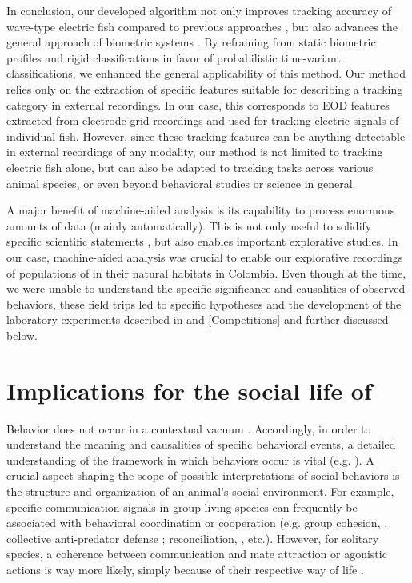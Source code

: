 In conclusion, our developed algorithm not only improves tracking accuracy of wave-type electric fish compared to previous approaches \citep{Madhav2018, Henninger2020}, but also advances the general approach of biometric systems \citep{Kuhl2013}. By refraining from static biometric profiles and rigid classifications in favor of probabilistic time-variant classifications, we enhanced the general applicability of this method. Our method relies only on the extraction of specific features suitable for describing a tracking category in external recordings. In our case, this corresponds to EOD features extracted from electrode grid recordings and used for tracking electric signals of individual fish. However, since these tracking features can be anything detectable in external recordings of any modality, our method is not limited to tracking electric fish alone, but can also be adapted to tracking tasks across various animal species, or even beyond behavioral studies or science in general. 

A major benefit of machine-aided analysis is its capability to process enormous amounts of data (mainly automatically). This is not only useful to solidify specific scientific statements \citep{Gomez2014, Dell2014}, but also enables important explorative studies. In our case, machine-aided analysis was crucial to enable our explorative recordings of populations of \lepto{} in their natural habitats in Colombia. Even though at the time, we were unable to understand the specific significance and causalities of observed behaviors, these field trips led to specific hypotheses and the development of the laboratory experiments described in  and \ref{Competitions} and further discussed below. 

\section{Implications for the social life of \lepto{}}

Behavior does not occur in a contextual vacuum \citep{Rendall1999, Seyfarth2017, Henninger2018}. Accordingly, in order to understand the meaning and causalities of specific behavioral events, a detailed understanding of the framework in which behaviors occur is vital (e.g. \citealp{Rendall1999, Henninger2018}). A crucial aspect shaping the scope of possible interpretations of social behaviors is the structure and organization of an animal's social environment. For example, specific communication signals in group living species can frequently be associated with behavioral coordination or cooperation (e.g. group cohesion, \citealp{Demartsev2018}, collective anti-predator defense \citealp{Schibler2007}; reconciliation, \citealp{Cheney1995}, etc.). However, for solitary species, a coherence between communication and mate attraction or agonistic actions is way more likely, simply because of their respective way of life \citep{Cornhill2020}. 

